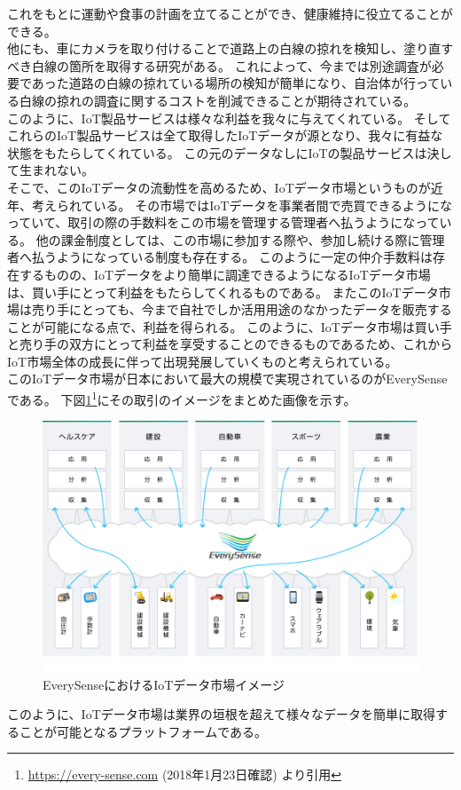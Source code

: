 これをもとに運動や食事の計画を立てることができ、健康維持に役立てることができる。 \\
他にも、車にカメラを取り付けることで道路上の白線の掠れを検知し、塗り直すべき白線の箇所を取得する研究\cite{dragnman_hakusen}がある。
これによって、今までは別途調査が必要であった道路の白線の掠れている場所の検知が簡単になり、自治体が行っている白線の掠れの調査に関するコストを削減できることが期待されている。 \\
このように、IoT製品サービスは様々な利益を我々に与えてくれている。
そしてこれらのIoT製品サービスは全て取得したIoTデータが源となり、我々に有益な状態をもたらしてくれている。
この元のデータなしにIoTの製品サービスは決して生まれない。 \\
そこで、このIoTデータの流動性を高めるため、IoTデータ市場というものが近年、考えられている。
その市場ではIoTデータを事業者間で売買できるようになっていて、取引の際の手数料をこの市場を管理する管理者へ払うようになっている。
他の課金制度としては、この市場に参加する際や、参加し続ける際に管理者へ払うようになっている制度も存在する。
このように一定の仲介手数料は存在するものの、IoTデータをより簡単に調達できるようになるIoTデータ市場は、買い手にとって利益をもたらしてくれるものである。
またこのIoTデータ市場は売り手にとっても、今まで自社でしか活用用途のなかったデータを販売することが可能になる点で、利益を得られる。
このように、IoTデータ市場は買い手と売り手の双方にとって利益を享受することのできるものであるため、これからIoT市場全体の成長に伴って出現発展していくものと考えられている。 \\
このIoTデータ市場が日本において最大の規模で実現されているのがEverySense\cite{everysense}である。
下図\ref{everysense}\footnote{\url{https://every-sense.com} (2018年1月23日確認) より引用}にその取引のイメージをまとめた画像を示す。
\begin{figure}[htbp]
 \centering
  \includegraphics[width=120mm]{image/everysense.png}
 \caption{EverySenseにおけるIoTデータ市場イメージ}
 \label{everysense}
\end{figure}
このように、IoTデータ市場は業界の垣根を超えて様々なデータを簡単に取得することが可能となるプラットフォームである。

